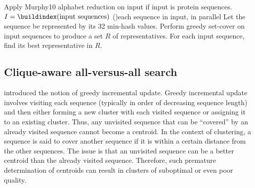 \documentclass[11pt,letterpaper]{article}
\begin{document}
\begin{algorithm}
	Apply Murphy10 alphabet reduction on input if input is protein sequences.\;
	\(I=\buildindex(\textnormal{input sequences})\) \;
	\For(){each sequence in input, in parallel}{
		Let the sequence be represented by its 32 min-hash values. \;
	}
	Perform greedy set-cover on input sequences to produce a set \(R\) of representatives.\;
	For each input sequence, find its best representative in \(R\).\;
	\;
\end{algorithm}

\subsection{Clique-aware all-versus-all search}
\label{subsec:clique-aware}
 introduced the notion of greedy incremental update.
Greedy incremental update involves visiting each sequence (typically in order of decreasing sequence length) and then either forming a new cluster with each visited sequence or assigning it to an existing cluster. Thus, any unvisited sequence that can be ``covered'' by an already visited sequence cannot become a centroid. 
In the context of clustering, a sequence is said to cover another sequence if it is within a certain distance from the other sequences. The issue is that an unvisited sequence can be a better centroid than the already visited sequence. 
Therefore, such premature determination of centroids can result in clusters of suboptimal or even poor quality.
\end{document}
